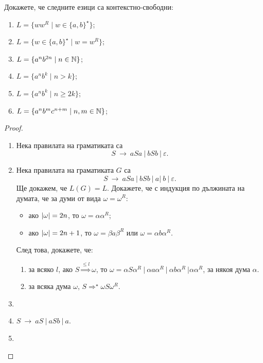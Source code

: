 \begin{problem}
  Докажете, че следните езици са контекстно-свободни:
  \begin{enumerate}[1)]
  \item
    $L = \{ww^R \mid w \in \{a,b\}^\star\}$;
  \item
    $L = \{w \in \{a,b\}^\star \mid w = w^R\}$;
  \item
    $L = \{a^nb^{2n} \mid n \in \mathbb{N}\}$;
  \item
    $L = \{a^nb^k \mid n > k\}$;
  \item
    $L = \{a^nb^k \mid n \geq 2k\}$;
  \item
    $L = \{a^nb^mc^{n+m}\mid n,m \in \mathbb{N}\}$;
  \end{enumerate}
\end{problem}
\begin{proof}
  \begin{enumerate}[1)]
  \item
    Нека правилата на граматиката са 
    \[S\ \rightarrow\ aSa\ \vert\ bSb\ \vert\ \varepsilon.\]
  \item
    Нека правилата на граматиката $G$ са 
    \[S\ \rightarrow\ aSa\ \vert\ bSb\ \vert\ a\vert\ b\ \vert\ \varepsilon.\]
    Ще докажем, че $L(G) = L$.
    Докажете, че с индукция по дължината на думата, че за думи от вида $\omega = \omega^R$:
    \begin{itemize}[-]
    \item 
      ако $\vert{\omega}\vert = 2n$, то $\omega = \alpha\alpha^R$;
    \item
      ако $\vert{\omega}\vert = 2n+1$, то $\omega = \beta a\beta^R$ или $\omega = \alpha b\alpha^R$.
    \end{itemize}
    След това, докажете, че:
    \begin{enumerate}
    \item 
      за всяко $l$,
      ако $S \stackrel{\leq l}{\Rightarrow} \omega$, то $\omega = \alpha S \alpha^R\ \vert\ \alpha a \alpha^R\ \vert\ \alpha b \alpha^R\ \vert \alpha\alpha^R$,
      за някоя дума $\alpha$.
    \item
      за всяка дума $\omega$,
      $S \Rightarrow^\star \omega S \omega^R$.
    \end{enumerate}
    
  \item
  \item
    $S\ \rightarrow\ aS\ \vert\ aSb\ \vert\ a$.
  \item
  \end{enumerate}

\end{proof}


